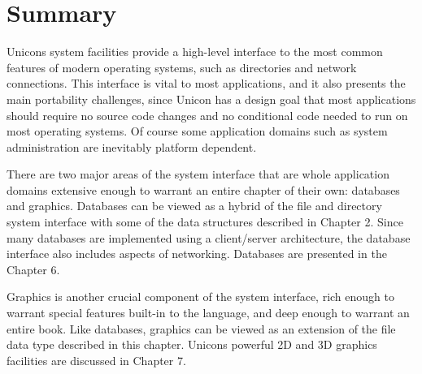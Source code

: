 \section*{Summary}

Unicon{\textquotesingle}s system facilities provide a high-level
interface to the most common features of modern operating systems, such
as directories and network connections. This interface is vital to most
applications, and it also presents the main portability challenges,
since Unicon has a design goal that most applications should require no
source code changes and no conditional code needed
to run on most operating systems. Of course some application domains
such as system administration are inevitably platform dependent.

There are two major areas of the system interface that are whole
application domains extensive enough to warrant an entire chapter of
their own: databases and graphics. Databases can be
viewed as a hybrid of the file and directory system interface with some
of the data structures described in Chapter 2. Since many databases are
implemented using a client/server architecture, the database interface
also includes aspects of networking. Databases are presented in the
Chapter 6.

Graphics is another crucial component of the system interface, rich
enough to warrant special features built-in to the language, and deep
enough to warrant an entire book. Like databases, graphics can be
viewed as an extension of the file data type described in this chapter.
Unicon{\textquotesingle}s powerful 2D and 3D graphics facilities are
discussed in Chapter 7.

